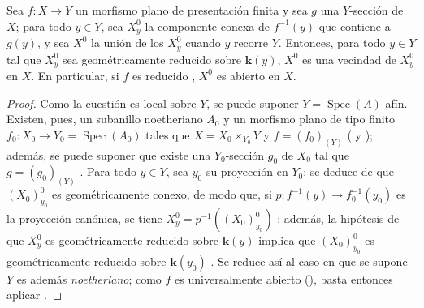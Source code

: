 \begin{corollary}[15.6.5]
\label{IV.15.6.5}
Sea $f:X\to Y$ un morfismo plano de presentación finita y sea $g$ una $Y$-sección de $X$; para todo $y\in Y$, sea $X_y^0$ la componente conexa de $f^{-1}(y)$ que contiene a $g(y)$, y sea $X^0$ la unión de los $X_y^0$ cuando $y$ recorre $Y$.
Entonces, para todo $y\in Y$ tal que $X_y^0$ sea geométricamente reducido sobre $\boldsymbol{k}(y)$, $X^0$ es una vecindad de $X_y^0$ en $X$.
En particular, si $f$ es reducido , $X^0$ es abierto en $X$.
\end{corollary}

\begin{proof}
Como la cuestión es local sobre $Y$, se puede suponer $Y=\operatorname{Spec}(A)$ afín.
Existen, pues, un subanillo noetheriano $A_0$ y un morfismo plano de tipo finito $f_0:X_0\to Y_0=\operatorname{Spec}(A_0)$ tales que $X=X_0\times_{Y_0}Y$ y $f=(f_0)_{(Y)}$ ( y ); además, se puede suponer que existe una $Y_0$-sección $g_0$ de $X_0$ tal que $g=(g_0)_{(Y)}$ .
Para todo $y\in Y$, sea $y_0$ su proyección en $Y_0$; se deduce de  que $(X_0)_{y_0}^0$ es geométricamente conexo, de modo que, si $p:f^{-1}(y)\to f_0^{-1}(y_0)$ es la proyección canónica, se tiene $X_y^0=p^{-1}((X_0)_{y_0}^0)$ ; además, la hipótesis de que $X_y^0$ es geométricamente reducido sobre $\boldsymbol{k}(y)$ implica que $(X_0)_{y_0}^0$ es geométricamente reducido sobre $\boldsymbol{k}(y_0)$ .
Se reduce así al caso en que se supone
$Y$ es además \emph{noetheriano}; como $f$ es universalmente abierto (), basta entonces aplicar .
\end{proof}

